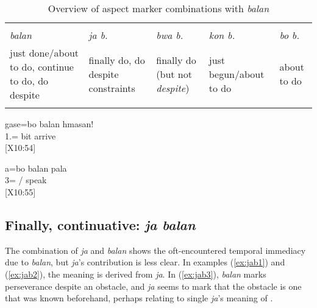 
\begin{table}
	\caption{Overview of aspect marker combinations with \textit{balan}}
	\begin{tabularx}{\textwidth}{QQQQl}
	\lsptoprule
		\\
		\textit{balan} & \textit{ja b.} & \textit{bwa b.} & \textit{kon b.} & \textit{bo b.}\\\midrule
		just done\slash about to do, continue to do, do despite  & finally do, do despite constraints & finally do (but not \textit{despite})& just begun\slash about to do & about to do\\
		\lspbottomrule
	\end{tabularx}
	\label{tab:balan}
\end{table}

\ea \label{ex:bo_balan} 
\gll gase=bo balan hmasan!\\
 1.=  bit arrive\\
\glt {} {[X10:54]}
\z

\ea 
\gll a=bo balan pala\\
 3= / speak\\
\glt {} {[X10:55]}
\z

\subsection{Finally, continuative: \textit{ja balan}}
\label{ssec:ja_balan}
The combination of \textit{ja}  and \textit{balan} shows the oft-encountered temporal immediacy due to \textit{balan}, but \textit{ja}'s contribution is less clear. In examples (\ref{ex:jab1}) and (\ref{ex:jab2}), the meaning  is derived from \textit{ja}. In (\ref{ex:jab3}), \textit{balan} marks perseverance despite an obstacle, and \textit{ja} seems to mark that the obstacle is one that was known beforehand, perhaps relating to single \textit{ja}'s meaning of .%

